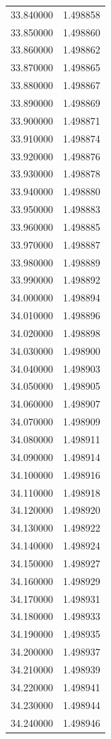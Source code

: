 \begin{tabular}{rr}
33.840000 & 1.498858 \\
33.850000 & 1.498860 \\
33.860000 & 1.498862 \\
33.870000 & 1.498865 \\
33.880000 & 1.498867 \\
33.890000 & 1.498869 \\
33.900000 & 1.498871 \\
33.910000 & 1.498874 \\
33.920000 & 1.498876 \\
33.930000 & 1.498878 \\
33.940000 & 1.498880 \\
33.950000 & 1.498883 \\
33.960000 & 1.498885 \\
33.970000 & 1.498887 \\
33.980000 & 1.498889 \\
33.990000 & 1.498892 \\
34.000000 & 1.498894 \\
34.010000 & 1.498896 \\
34.020000 & 1.498898 \\
34.030000 & 1.498900 \\
34.040000 & 1.498903 \\
34.050000 & 1.498905 \\
34.060000 & 1.498907 \\
34.070000 & 1.498909 \\
34.080000 & 1.498911 \\
34.090000 & 1.498914 \\
34.100000 & 1.498916 \\
34.110000 & 1.498918 \\
34.120000 & 1.498920 \\
34.130000 & 1.498922 \\
34.140000 & 1.498924 \\
34.150000 & 1.498927 \\
34.160000 & 1.498929 \\
34.170000 & 1.498931 \\
34.180000 & 1.498933 \\
34.190000 & 1.498935 \\
34.200000 & 1.498937 \\
34.210000 & 1.498939 \\
34.220000 & 1.498941 \\
34.230000 & 1.498944 \\
34.240000 & 1.498946 \\

\end{tabular}
